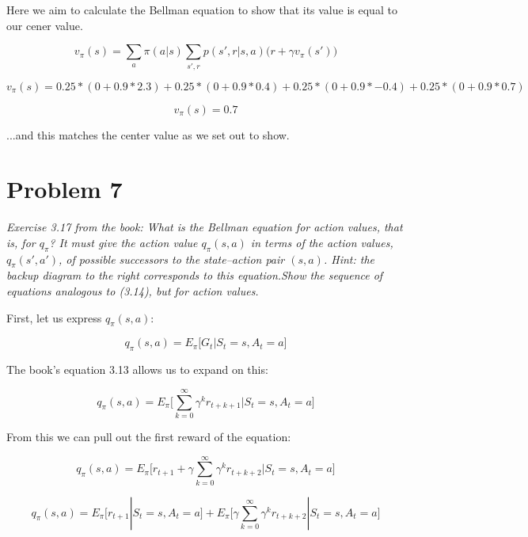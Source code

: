 \documentclass{article}
\begin{document}
Here we aim to calculate the Bellman equation to show that its value is equal to our cener value.

\begin{equation}
    v_\pi (s) = \sum_a \pi(a|s) \sum_{s',r} p(s',r|s,a) \bigl( r+\gamma v_\pi (s') \bigr)
\end{equation}

\begin{equation}
    v_\pi (s) = 0.25*(0+0.9*2.3)+0.25* (0 + 0.9 * 0.4) + 0.25*(0+ 0.9*-0.4) + 0.25*(0+0.9*0.7)
\end{equation}

\begin{equation}
    v_\pi (s) = 0.7
\end{equation}

\noindent ...and this matches the center value as we set out to show.

\section*{Problem 7}

\textit{Exercise 3.17 from the book: What is the Bellman equation for action values, that is, for $q_\pi$? It must give the action value $q_\pi ( s, a )$ in terms of the action values, $q_\pi ( s' , a' )$, of possible successors to the state–action pair $( s, a )$. Hint: the backup diagram to the right corresponds to this equation.Show the sequence of equations analogous to (3.14), but for action values.}

First, let us express $q_\pi (s, a)$:

\begin{equation}
    q_\pi (s,a) = E_\pi \big[ G_t | S_t = s, A_t = a \big]
\end{equation}

\noindent The book's equation 3.13 allows us to expand on this:

\begin{equation}
    q_\pi(s,a) = E_\pi \big[ \sum^\infty_{k=0} \gamma^k r_{t+k+1} | S_t = s,A_t =a \big]
\end{equation}

\noindent From this we can pull out the first reward of the equation:

\begin{equation}
    q_\pi(s,a) = E_\pi \big[ r_{t+1} + \gamma \sum^\infty_{k=0} \gamma^k r_{t+k+2} | S_t = s,A_t =a \big]
\end{equation}

\begin{equation}
    q_\pi(s,a) = E_\pi \big[ r_{t+1} | S_t=s, A_t=a \big] + E_\pi \big[ \gamma \sum^\infty_{k=0} \gamma^k r_{t+k+2} | S_t = s,A_t =a \big]
\end{equation}
\end{document}
